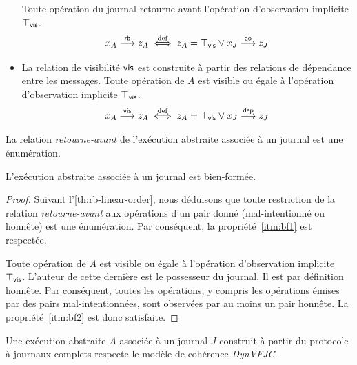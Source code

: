 \begin{definition}
\begin{itemize}
Toute opération du journal retourne-avant l'opération d'observation implicite $\top_{\operatorname{\mathsf{vis}}}$.
\begin{equation*}
    x_A \overset{\mathsf{rb}}{\longrightarrow} z_A \overset{\mathrm{def}}{\iff} z_A = \top_{\operatorname{\mathsf{vis}}} \lor x_J \overset{\mathsf{ao}}{\longrightarrow} z_J
\end{equation*}
\item La relation de visibilité $\operatorname{\mathsf{vis}}$ est construite à partir des relations de dépendance entre les messages.
Toute opération de $A$ est visible ou égale à l'opération d'observation implicite $\top_{\operatorname{\mathsf{vis}}}$.
\begin{equation*}
    x_A \overset{\mathsf{vis}}{\longrightarrow} z_A \overset{\mathrm{def}}{\iff} z_A = \top_{\operatorname{\mathsf{vis}}} \lor x_J \overset{\mathsf{dep}}{\longrightarrow} z_J
\end{equation*}
\end{itemize}
\end{definition}


\begin{claim}\label{th:rb-linear-order}
La relation \emph{retourne-avant} de l'exécution abstraite associée à un journal est une énumération.
\end{claim}

\begin{proposition}
L'exécution abstraite associée à un journal est bien-formée.
\end{proposition}

\begin{proof}
Suivant l'\autoref{th:rb-linear-order}, nous déduisons que toute restriction de la relation \emph{retourne-avant} aux opérations d'un pair donné (mal-intentionné ou honnête) est une énumération.
Par conséquent, la propriété~\ref{itm:bf1} est respectée.

Toute opération de $A$ est visible ou égale à l'opération d'observation implicite $\top_{\operatorname{\mathsf{vis}}}$.
L'auteur de cette dernière est le possesseur du journal.
Il est par définition honnête.
Par conséquent, toutes les opérations, y compris les opérations émises par des pairs mal-intentionnées, sont observées par au moins un pair honnête.
La propriété~\ref{itm:bf2} est donc satisfaite.
\end{proof}

\begin{theorem}
Une exécution abstraite $A$ associée à un journal $J$ construit à partir du protocole à journaux complets respecte le modèle de cohérence \emph{DynVFJC}.
\end{theorem}

